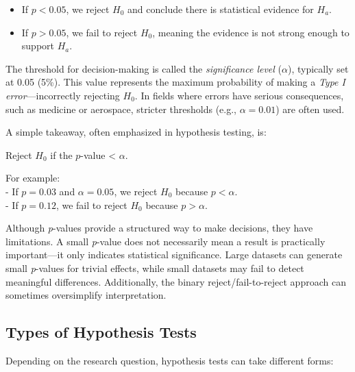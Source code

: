 \documentclass[
  11pt,
]{book}
\providecommand{\tightlist}{%
  \setlength{\itemsep}{0pt}\setlength{\parskip}{0pt}}
\theoremstyle{definition}
\theoremstyle{definition}
\theoremstyle{definition}
\theoremstyle{definition}
\theoremstyle{remark}
\begin{document}
\begin{itemize}
\tightlist
\item
  If \(p < 0.05\), we reject \(H_0\) and conclude there is statistical evidence for \(H_a\).\\
\item
  If \(p > 0.05\), we fail to reject \(H_0\), meaning the evidence is not strong enough to support \(H_a\).
\end{itemize}

The threshold for decision-making is called the \emph{significance level} (\(\alpha\)), typically set at 0.05 (5\%). This value represents the maximum probability of making a \emph{Type I error}---incorrectly rejecting \(H_0\). In fields where errors have serious consequences, such as medicine or aerospace, stricter thresholds (e.g., \(\alpha = 0.01\)) are often used.

A simple takeaway, often emphasized in hypothesis testing, is:

Reject \(H_0\) if the \(p\)-value \textless{} \(\alpha\).

For example:\\
- If \(p = 0.03\) and \(\alpha = 0.05\), we reject \(H_0\) because \(p < \alpha\).\\
- If \(p = 0.12\), we fail to reject \(H_0\) because \(p > \alpha\).

Although \emph{p}-values provide a structured way to make decisions, they have limitations. A small \emph{p}-value does not necessarily mean a result is practically important---it only indicates statistical significance. Large datasets can generate small \emph{p}-values for trivial effects, while small datasets may fail to detect meaningful differences. Additionally, the binary reject/fail-to-reject approach can sometimes oversimplify interpretation.

\subsection{Types of Hypothesis Tests}\label{types-of-hypothesis-tests}

Depending on the research question, hypothesis tests can take different forms:
\end{document}
